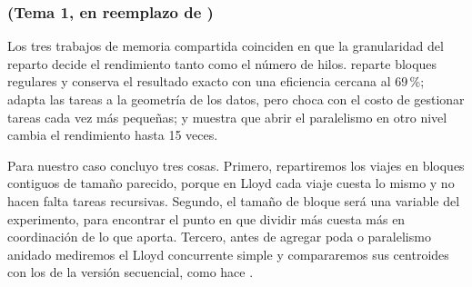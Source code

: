 \subsubsection*{\nombreRody{} (Tema 1, en reemplazo de \nombreTercero)}
Los tres trabajos de memoria compartida coinciden en que la granularidad del reparto decide el
rendimiento tanto como el número de hilos. \textcite{nigro2022} reparte bloques regulares y conserva el
resultado exacto con una eficiencia cercana al 69\,\%; \textcite{kwedlo2021} adapta las tareas a la
geometría de los datos, pero choca con el costo de gestionar tareas cada vez más pequeñas; y
\textcite{kwedlo2024} muestra que abrir el paralelismo en otro nivel cambia el rendimiento hasta 15
veces.

Para nuestro caso concluyo tres cosas. Primero, repartiremos los viajes en bloques contiguos de tamaño
parecido, porque en Lloyd cada viaje cuesta lo mismo y no hacen falta tareas recursivas. Segundo, el
tamaño de bloque será una variable del experimento, para encontrar el punto en que dividir más cuesta
más en coordinación de lo que aporta. Tercero, antes de agregar poda o paralelismo anidado mediremos
el Lloyd concurrente simple y compararemos sus centroides con los de la versión secuencial, como hace
\textcite{nigro2022}.
